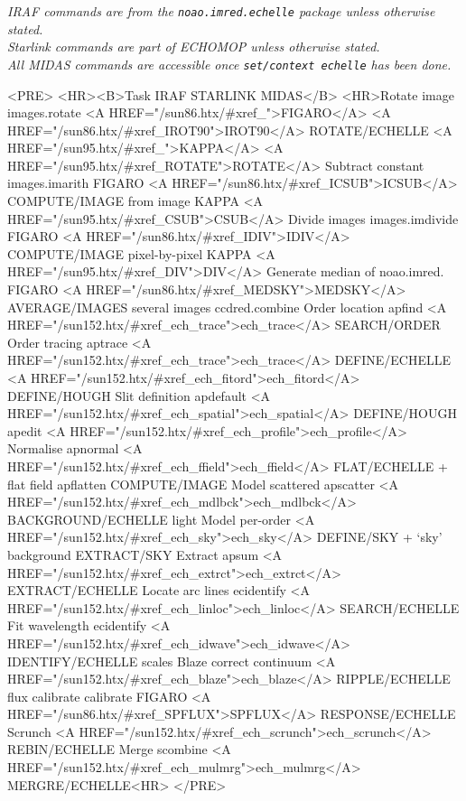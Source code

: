 \documentclass[twoside,11pt]{article}
\newcommand{\xref}[3]{#1}
\begin{document}
\begin{htmlonly}
{\sl
IRAF commands are from the {\tt noao.imred.echelle} package unless otherwise
stated.\\
Starlink commands are part of \xref{ECHOMOP}{sun152}{} unless otherwise stated.\\
All MIDAS commands are accessible once {\tt set/context echelle} has been
done.}
\begin{rawhtml}
<PRE>
<HR><B>Task               IRAF             STARLINK       MIDAS</B>
<HR>Rotate image       images.rotate    <A HREF="/sun86.htx/#xref_">FIGARO</A> <A HREF="/sun86.htx/#xref_IROT90">IROT90</A>  ROTATE/ECHELLE
                                    <A HREF="/sun95.htx/#xref_">KAPPA</A> <A HREF="/sun95.htx/#xref_ROTATE">ROTATE</A>
Subtract constant  images.imarith   FIGARO <A HREF="/sun86.htx/#xref_ICSUB">ICSUB</A>   COMPUTE/IMAGE
from image                          KAPPA <A HREF="/sun95.htx/#xref_CSUB">CSUB</A>
Divide images      images.imdivide  FIGARO <A HREF="/sun86.htx/#xref_IDIV">IDIV</A>    COMPUTE/IMAGE
pixel-by-pixel                      KAPPA <A HREF="/sun95.htx/#xref_DIV">DIV</A>
Generate median of noao.imred.      FIGARO <A HREF="/sun86.htx/#xref_MEDSKY">MEDSKY</A>  AVERAGE/IMAGES
several images     ccdred.combine
Order location     apfind           <A HREF="/sun152.htx/#xref_ech_trace">ech_trace</A>      SEARCH/ORDER
Order tracing      aptrace          <A HREF="/sun152.htx/#xref_ech_trace">ech_trace</A>      DEFINE/ECHELLE
                                    <A HREF="/sun152.htx/#xref_ech_fitord">ech_fitord</A>     DEFINE/HOUGH
Slit definition    apdefault        <A HREF="/sun152.htx/#xref_ech_spatial">ech_spatial</A>    DEFINE/HOUGH
                   apedit           <A HREF="/sun152.htx/#xref_ech_profile">ech_profile</A>
Normalise          apnormal         <A HREF="/sun152.htx/#xref_ech_ffield">ech_ffield</A>     FLAT/ECHELLE +
flat field         apflatten                       COMPUTE/IMAGE
Model scattered    apscatter        <A HREF="/sun152.htx/#xref_ech_mdlbck">ech_mdlbck</A>     BACKGROUND/ECHELLE
light
Model per-order                     <A HREF="/sun152.htx/#xref_ech_sky">ech_sky</A>        DEFINE/SKY +
`sky' background                                   EXTRACT/SKY
Extract            apsum            <A HREF="/sun152.htx/#xref_ech_extrct">ech_extrct</A>     EXTRACT/ECHELLE
Locate arc lines   ecidentify       <A HREF="/sun152.htx/#xref_ech_linloc">ech_linloc</A>     SEARCH/ECHELLE
Fit wavelength     ecidentify       <A HREF="/sun152.htx/#xref_ech_idwave">ech_idwave</A>     IDENTIFY/ECHELLE
scales
Blaze correct      continuum        <A HREF="/sun152.htx/#xref_ech_blaze">ech_blaze</A>      RIPPLE/ECHELLE
flux calibrate     calibrate        FIGARO <A HREF="/sun86.htx/#xref_SPFLUX">SPFLUX</A>  RESPONSE/ECHELLE
Scrunch                             <A HREF="/sun152.htx/#xref_ech_scrunch">ech_scrunch</A>    REBIN/ECHELLE
Merge              scombine         <A HREF="/sun152.htx/#xref_ech_mulmrg">ech_mulmrg</A>     MERGRE/ECHELLE<HR>
</PRE>
\end{rawhtml}
\end{htmlonly}
\end{document}
